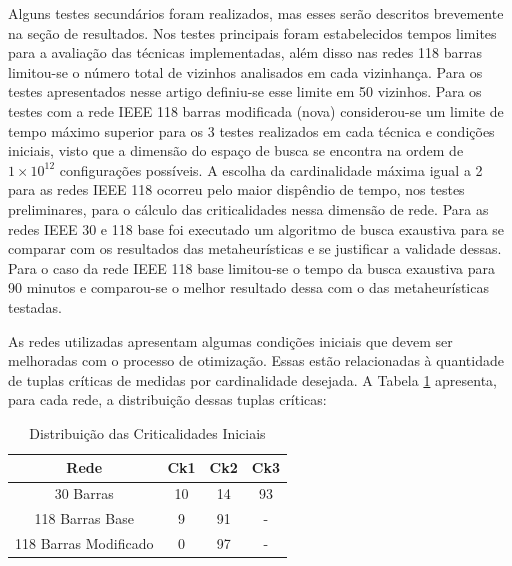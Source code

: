 \documentclass[12pt]{article}
\begin{document}

Alguns testes secundários foram realizados, mas esses serão descritos brevemente na seção de resultados. Nos testes principais foram estabelecidos tempos limites para a avaliação das técnicas implementadas, além disso nas redes 118 barras limitou-se o número total de vizinhos analisados em cada vizinhança. Para os testes apresentados nesse artigo definiu-se esse limite em 50 vizinhos. Para os testes com a rede IEEE 118 barras modificada (nova) considerou-se um limite de tempo máximo superior para os 3 testes realizados em cada técnica e condições iniciais, visto que a dimensão do espaço de busca se encontra na ordem de $1 \times 10^{12}$ configurações possíveis. A escolha da cardinalidade máxima igual a 2 para as redes IEEE 118 ocorreu pelo maior dispêndio de tempo, nos testes preliminares, para o cálculo das criticalidades nessa dimensão de rede. Para as redes IEEE 30 e 118 base foi executado um algoritmo de busca exaustiva para se comparar com os resultados das metaheurísticas e se justificar a validade dessas. Para o caso da rede IEEE 118 base limitou-se o tempo da busca exaustiva para 90 minutos e comparou-se o melhor resultado dessa com o das metaheurísticas testadas.

As redes utilizadas apresentam algumas condições iniciais que devem ser melhoradas com o processo de otimização. Essas estão relacionadas à quantidade de tuplas críticas de medidas por cardinalidade desejada. A Tabela \ref{tab5} apresenta, para cada rede, a distribuição dessas tuplas críticas:

\begin{table}[H]
	\centering
	\caption{Distribuição das Criticalidades Iniciais}
	\begin{tabular}{|c|c|c|c|}
		\hline
		\textbf{Rede } & \textbf{Ck1} & \textbf{Ck2} & \textbf{Ck3} \\
		\hline
		30 Barras &     10  & 14      & 93 \\
		\hline
		118 Barras Base &   9    &   91    & - \\
		\hline
		118 Barras Modificado &   0     & 97       &  - \\
		\hline
	\end{tabular}%
	\label{tab5}%
\end{table}%
\end{document}
